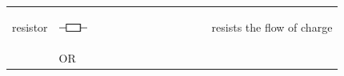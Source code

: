 \begin{center}
\begin{xtabular*}{\mytablewidth}[t]{|p{10\mystarwidth}|p{10\mystarwidth}|p{10\mystarwidth}|}
    
        resistor &
    
    
        
                    
    \setcounter{subfigure}{0}

\label{m38516*id63001}
    \begin{center}
    \label{m38516*id63001!!!underscore!!!media}\label{m38516*id63001!!!underscore!!!printimage}\includegraphics[width=0.2\textwidth]{col11305.imgs/m38516_PG10C9_004.png} %
        
      \vspace{2pt}
    \vspace{.1in}
    
    \end{center}



    \addtocounter{footnote}{-0}
    
                   &
    
    
        resists the flow of charge%
     \tabularnewline{}
    
    
         &
    
    
        OR &
    
    

\end{xtabular*}
\end{center}
